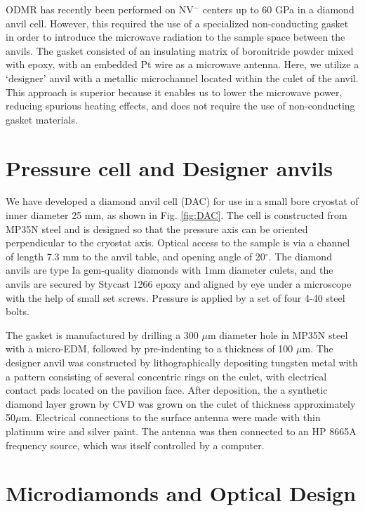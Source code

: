 \documentclass[%
 aip,
 sd,%
 amsmath,amssymb,
 reprint,%
 longbibliography
]{revtex4-1}
\begin{document}
ODMR has recently been performed on NV$^-$ centers up to 60 GPa in a diamond anvil cell.\cite{NVpressurePRL}   However, this required the use of a specialized non-conducting gasket in order to introduce the microwave radiation to the sample space between the anvils. The gasket consisted of an insulating matrix of boronitride powder mixed with epoxy, with an embedded Pt wire as a microwave antenna.  Here, we utilize a `designer' anvil with a metallic microchannel located within the culet of the anvil. This approach is superior because it enables us to lower the microwave power, reducing spurious heating effects, and does not require the use of non-conducting gasket materials.


\section{Pressure cell and Designer anvils}

We have developed a diamond anvil cell (DAC) for use in a small bore cryostat of inner diameter 25 mm, as shown in Fig. \ref{fig:DAC}. The cell is constructed from MP35N steel and is designed so that the pressure axis can be oriented perpendicular to the cryostat axis. Optical access to the sample is via a channel of length 7.3 mm to the anvil table, and opening angle of 20$^{\circ}$. The diamond anvils are type Ia gem-quality diamonds with 1mm diameter culets, and the anvils are secured by Stycast 1266 epoxy and aligned by eye under a microscope with the help of small set screws.  Pressure is applied by a set of four 4-40 steel bolts.

The gasket is manufactured by drilling a 300 $\mu$m diameter hole in MP35N steel  with a micro-EDM, followed by pre-indenting to a thickness of 100 $\mu$m.  The designer anvil was constructed by lithographically depositing tungsten metal with a pattern consisting of several concentric rings on the culet, with electrical contact pads located on the pavilion face.\cite{WierDACmicroheater,WeirSusceptibilityDACreview,WeirPRL}   After deposition, the a synthetic diamond layer grown by CVD was grown on the culet of thickness approximately 50$\mu$m.\cite{WeirDesignerDiamondLetter}  Electrical connections to the surface antenna were made with thin platinum wire and silver paint.  The antenna was then connected to an HP 8665A frequency source, which was itself controlled by a computer.



\section{Microdiamonds and Optical Design}
\end{document}
